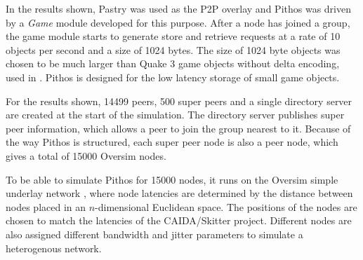 In the results shown, Pastry was used as the P2P overlay and Pithos was driven by a \emph{Game} module developed for this purpose. After a node has
joined a group, the game module starts to generate store and retrieve requests at a rate of 10 objects per second and a size of 1024 bytes. The size
of 1024 byte objects was chosen to be much larger than Quake 3 game objects without delta encoding, used in \cite{Bharambe_Donnybrook}. Pithos is
designed for the low latency storage of small game objects.

For the results shown, 14499 peers, 500 super peers and a single directory server are created at the start of the simulation. The directory server
publishes super peer information, which allows a peer to join the group nearest to it. Because of the way Pithos is structured, each super peer node
is also a peer node, which gives a total of 15000 Oversim nodes.

To be able to simulate Pithos for 15000 nodes, it runs on the Oversim simple underlay network \cite{oversim_applications}, where node latencies are
determined by the distance between nodes placed in an $n$-dimensional Euclidean space. The positions of the nodes are chosen to match the latencies
of the CAIDA/Skitter project. Different nodes are also assigned different bandwidth and jitter parameters to simulate a heterogenous network.
